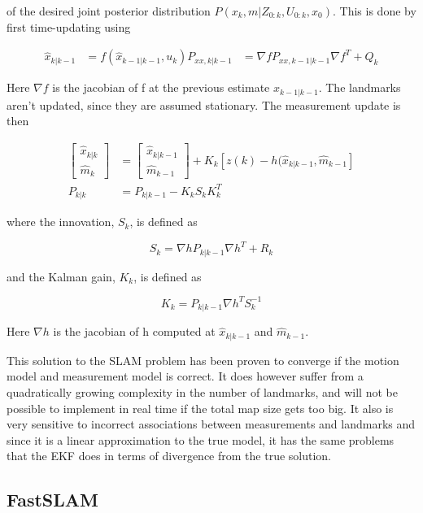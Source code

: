of the desired joint posterior distribution $P(x_k,m|Z_{0:k},U_{0:k},x_0)$. This is done by first time-updating using

\begin{align}
    \hat{x}_{k|k-1} &= f(\hat{x}_{k-1|k-1},u_k)
    P_{xx,k|k-1} &= \nabla f P_{xx,k-1|k-1}\nabla f^T + Q_k 
\end{align}

Here $\nabla f$ is the jacobian of f at the previous estimate $\hat{x}_{k-1|k-1}$. The landmarks aren't updated, since they are assumed stationary. The measurement update is then

\begin{align}
    \begin{bmatrix} \hat{x}_{k|k} \\ \hat{m}_k \end{bmatrix} &= 
    \begin{bmatrix} \hat{x}_{k|k-1} \\ \hat{m}_{k-1} \end{bmatrix}
    + K_k[z(k) - h(\hat{x}_{k|k-1},\hat{m}_{k-1}] \\
    P_{k|k} &= P_{k|k-1} - K_kS_kK_k^T
\end{align}

where the innovation, $S_k$, is defined as

\begin{equation}
    S_k = \nabla hP_{k|k-1}\nabla h^T + R_k
\end{equation}

and the Kalman gain, $K_k$, is defined as

\begin{equation}
    K_k = P_{k|k-1}\nabla h^T S_k^{-1}
\end{equation}

Here $\nabla h$ is the jacobian of h computed at $\hat{x}_{k|k-1}$ and $\hat{m}_{k-1}$. 

This solution to the SLAM problem has been proven to converge if the motion model and measurement model is correct. It does however suffer from a quadratically growing complexity in the number of landmarks, and will not be possible to implement in real time if the total map size gets too big. It also is very sensitive to incorrect associations between measurements and landmarks and since it is a linear approximation to the true model, it has the same problems that the EKF does in terms of divergence from the true solution. 

\subsection{FastSLAM}

